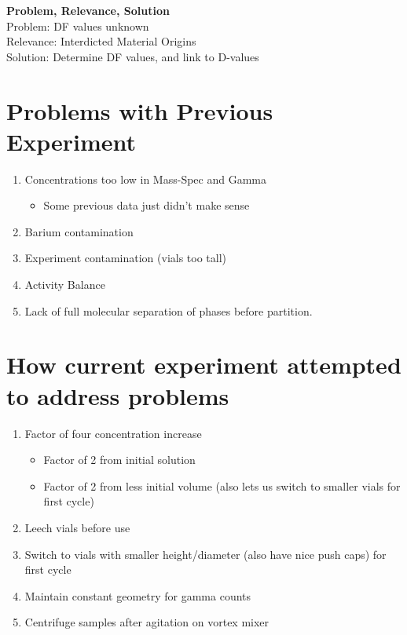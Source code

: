 \documentclass[11pt,notitlepage]{article}
\begin{document}
\vspace*{0.5cm}


\vspace{1cm}
\textbf{Problem, Relevance, Solution}\\
Problem: DF values unknown\\
Relevance: Interdicted Material Origins\\
Solution: Determine DF values, and link to D-values

 
\section{Problems with Previous Experiment}
\begin{enumerate}
\item{Concentrations too low in Mass-Spec and Gamma}
  \begin{itemize}
  \item{Some previous data just didn't make sense}
  \end{itemize}
\item{Barium contamination}
\item{Experiment contamination (vials too tall)}
\item{Activity Balance}
\item{Lack of full molecular separation of phases before partition.}
\end{enumerate}


\section{How current experiment attempted to address problems}
\begin{enumerate}
\item{Factor of four concentration increase}
  \begin{itemize}
  \item{Factor of 2 from initial solution}
  \item{Factor of 2 from less initial volume (also lets us switch
  to smaller vials for first cycle)}
  \end{itemize}
\item{Leech vials before use}
\item{Switch to vials with smaller height/diameter (also have nice push caps)
  for first cycle}
\item{Maintain constant geometry for gamma counts}
\item{Centrifuge samples after agitation on vortex mixer}
\end{enumerate}
\end{document}
